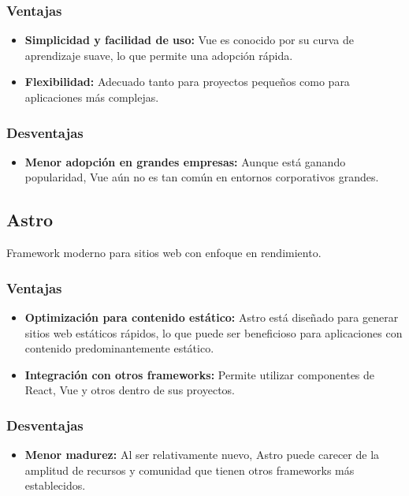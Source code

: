 \subsubsection{Ventajas}
\begin{itemize}
    \item \textbf{Simplicidad y facilidad de uso:} Vue es conocido por su curva de aprendizaje suave, lo que permite una adopción rápida.
    
    \item \textbf{Flexibilidad:} Adecuado tanto para proyectos pequeños como para aplicaciones más complejas.
\end{itemize}

\subsubsection{Desventajas}
\begin{itemize}
    \item \textbf{Menor adopción en grandes empresas:} Aunque está ganando popularidad, Vue aún no es tan común en entornos corporativos grandes.
\end{itemize}

\subsection{Astro}
Framework moderno para sitios web con enfoque en rendimiento.

\subsubsection{Ventajas}
\begin{itemize}
    \item \textbf{Optimización para contenido estático:} Astro está diseñado para generar sitios web estáticos rápidos, lo que puede ser beneficioso para aplicaciones con contenido predominantemente estático.
    
    \item \textbf{Integración con otros frameworks:} Permite utilizar componentes de React, Vue y otros dentro de sus proyectos.
\end{itemize}

\subsubsection{Desventajas}
\begin{itemize}
    \item \textbf{Menor madurez:} Al ser relativamente nuevo, Astro puede carecer de la amplitud de recursos y comunidad que tienen otros frameworks más establecidos.
\end{itemize}